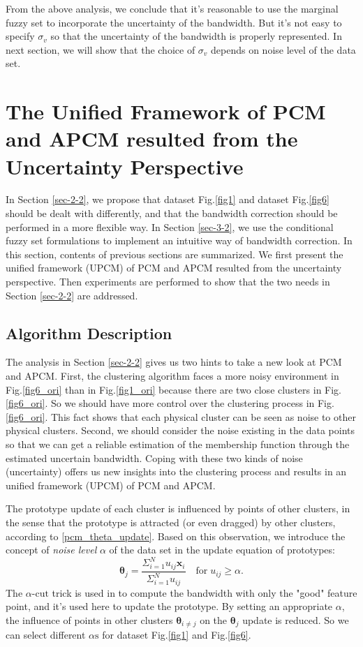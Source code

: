 \documentclass[journal,transmag]{IEEEtran}
\theoremstyle{definition}
\begin{document}
From the above analysis, we conclude that it's reasonable to use the marginal fuzzy set to incorporate the uncertainty of the bandwidth. But it's not easy to specify $\sigma_v$ so that the uncertainty of the bandwidth is properly represented. In next section, we will show that the choice of $\sigma_v$ depends on noise level of the data set.
\section{The Unified Framework of PCM and APCM resulted from the Uncertainty Perspective}
\label{sec-4}
In Section \ref{sec-2-2}, we propose that dataset Fig.\ref{fig1} and dataset Fig.\ref{fig6} should be dealt with differently, and that the bandwidth correction should be performed in a more flexible way. In Section \ref{sec-3-2}, we use the conditional fuzzy set formulations to implement an intuitive way of bandwidth correction. In this section, contents of previous sections are summarized. We first present the unified framework (UPCM) of PCM and APCM resulted from the uncertainty perspective. Then experiments are performed to show that the two needs in Section \ref{sec-2-2} are addressed.
\subsection{Algorithm Description}
\label{sec-4-1}
The analysis in Section \ref{sec-2-2} gives us two hints to take a new look at PCM and APCM.
First, the clustering algorithm faces a more noisy environment in Fig.\ref{fig6_ori} than in Fig.\ref{fig1_ori} because there are two close clusters in Fig.\ref{fig6_ori}. So we should have more control over the clustering process in Fig.\ref{fig6_ori}. This fact shows that each physical cluster can be seen as noise to other physical clusters.
Second, we should consider the noise existing in the data points so that we can get a reliable estimation of the membership function through the estimated uncertain bandwidth.
Coping with these two kinds of noise (uncertainty) offers us new insights into the clustering process and results in an unified framework (UPCM) of PCM and APCM.

The prototype update of each cluster is influenced by points of other clusters, in the sense that the prototype is attracted (or even dragged) by other clusters, according to \eqref{pcm_theta_update}.
Based on this observation, we introduce the concept of \emph{noise level} $\alpha$ of the data set in the update equation of prototypes:
\begin{equation}
\label{upcm_theta_update}
\boldsymbol{\theta}_j=\frac{\Sigma_{i=1}^Nu_{ij}\mathbf{x}_i}{\Sigma_{i=1}^Nu_{ij}} \quad \text{for}\;u_{ij}\geq \alpha.
\end{equation}
The $\alpha\text{-cut}$ trick is used in \cite{krishnapuram_possibilistic_1993} to compute the bandwidth with only the "good" feature point, and it's used here to update the prototype. By setting an appropriate $\alpha$, the influence of points in other clusters $\boldsymbol{\theta}_{i\neq j}$ on the $\boldsymbol{\theta}_j$ update is reduced. So we can select different $\alpha\text{s}$ for dataset Fig.\ref{fig1} and Fig.\ref{fig6}.
\end{document}
